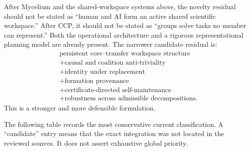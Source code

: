 After Mycelium and the shared-workspace systems above, the novelty residual
should not be stated as ``human and AI form an active shared scientific
workspace.'' After CCP, it should not be stated as ``groups solve tasks no
member can represent.'' Both the operational architecture and a rigorous
representational planning model are already present. The narrower candidate residual is:
\[
\boxed{
\begin{aligned}
&\text{persistent core--transfer workspace structure}\\
&+\text{causal and coalition anti-triviality}\\
&+\text{identity under replacement}\\
&+\text{formation provenance}\\
&+\text{certificate-directed self-maintenance}\\
&+\text{robustness across admissible decompositions}.
\end{aligned}
}
\]
This is a stronger and more defensible formulation.



The following table records the most conservative current classification. A
``candidate'' entry means that the exact integration was not located in the
reviewed sources. It does not assert exhaustive global priority.

